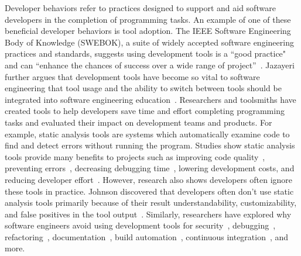 Developer behaviors refer to practices designed to support and aid software developers in the completion of programming tasks. An example of one of these beneficial developer behaviors is tool adoption. The IEEE Software Engineering Body of Knowledge (SWEBOK), a suite of widely accepted software engineering practices and standards, suggests using development tools is a ``good practice" and can ``enhance the chances of success over a wide range of project”~\cite[p.~A-4]{SWEBOK}. Jazayeri further argues that development tools have become so vital to software engineering that tool usage and the ability to switch between tools should be integrated into software engineering education~\cite{jazayeri2004education}. Researchers and toolsmiths have created tools to help developers save time and effort completing programming tasks and evaluated their impact on development teams and products. For example, static analysis tools are systems which automatically examine code to find and detect errors without running the program. Studies show static analysis tools provide many benefits to projects such as improving code quality~\cite{GoogleFixit}, preventing errors~\cite{bessey2010few}, decreasing debugging time~\cite{Williams2007FaultFixTime}, lowering development costs, and reducing developer effort~\cite{singh2017staticreview}. However, research also shows developers often ignore these tools in practice. Johnson discovered that developers often don't use static analysis tools primarily because of their result understandability, customizability, and false positives in the tool output~\cite{Johnson2013Why}. Similarly, researchers have explored why software engineers avoid using development tools for security~\cite{Xiao2014Security}, debugging~\cite{Cao2010Debugging}, refactoring~\cite{Murphy-HillBarriersRefactoring}, documentation~\cite{Forward2002Documentation}, build automation~\cite{Akond2017BuildTools}, continuous integration~\cite{hilton2017CI}, and more. 

